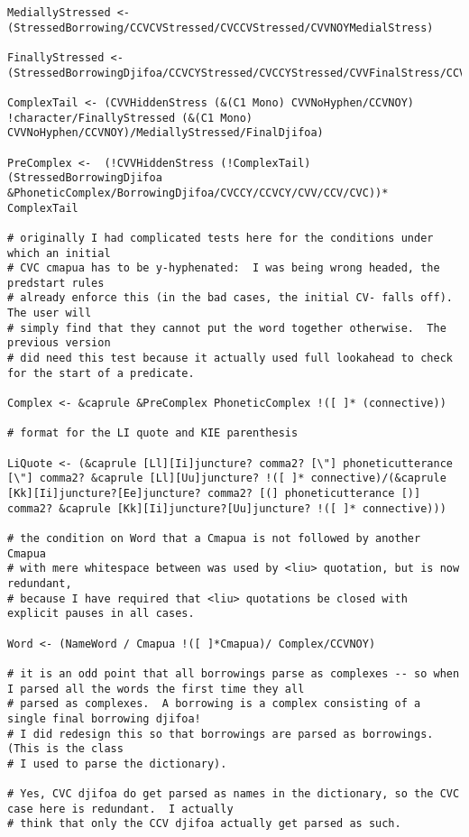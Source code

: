 \documentclass[12pt]{book}
\begin{document}
{\begin{verbatim}
MediallyStressed <- (StressedBorrowing/CCVCVStressed/CVCCVStressed/CVVNOYMedialStress)

FinallyStressed <-(StressedBorrowingDjifoa/CCVCYStressed/CVCCYStressed/CVVFinalStress/CCVStressed/CVCStressed)

ComplexTail <- (CVVHiddenStress (&(C1 Mono) CVVNoHyphen/CCVNOY) !character/FinallyStressed (&(C1 Mono) CVVNoHyphen/CCVNOY)/MediallyStressed/FinalDjifoa)

PreComplex <-  (!CVVHiddenStress (!ComplexTail)(StressedBorrowingDjifoa &PhoneticComplex/BorrowingDjifoa/CVCCY/CCVCY/CVV/CCV/CVC))* ComplexTail

# originally I had complicated tests here for the conditions under which an initial
# CVC cmapua has to be y-hyphenated:  I was being wrong headed, the predstart rules
# already enforce this (in the bad cases, the initial CV- falls off).  The user will
# simply find that they cannot put the word together otherwise.  The previous version
# did need this test because it actually used full lookahead to check for the start of a predicate.

Complex <- &caprule &PreComplex PhoneticComplex !([ ]* (connective))

# format for the LI quote and KIE parenthesis

LiQuote <- (&caprule [Ll][Ii]juncture? comma2? [\"] phoneticutterance [\"] comma2? &caprule [Ll][Uu]juncture? !([ ]* connective)/(&caprule [Kk][Ii]juncture?[Ee]juncture? comma2? [(] phoneticutterance [)] comma2? &caprule [Kk][Ii]juncture?[Uu]juncture? !([ ]* connective)))

# the condition on Word that a Cmapua is not followed by another Cmapua
# with mere whitespace between was used by <liu> quotation, but is now redundant,
# because I have required that <liu> quotations be closed with explicit pauses in all cases.

Word <- (NameWord / Cmapua !([ ]*Cmapua)/ Complex/CCVNOY)

# it is an odd point that all borrowings parse as complexes -- so when I parsed all the words the first time they all
# parsed as complexes.  A borrowing is a complex consisting of a single final borrowing djifoa!
# I did redesign this so that borrowings are parsed as borrowings.  (This is the class
# I used to parse the dictionary).

# Yes, CVC djifoa do get parsed as names in the dictionary, so the CVC case here is redundant.  I actually
# think that only the CCV djifoa actually get parsed as such.


\end{verbatim}}
\end{document}
